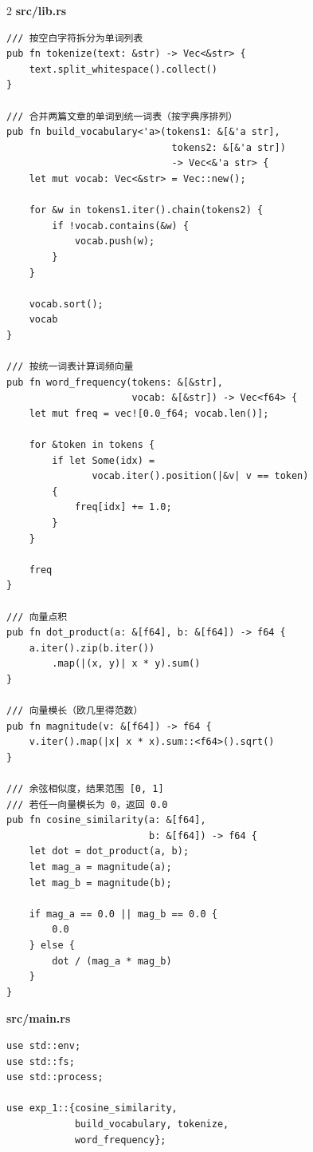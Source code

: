 {
\fontsize{7.5pt}{10pt}\selectfont
\setlength{\parindent}{0pt}
\setlength{\columnsep}{0.8cm}
\begin{multicols}{2}
\noindent\textbf{src/lib.rs}\par

\begin{verbatim}
/// 按空白字符拆分为单词列表
pub fn tokenize(text: &str) -> Vec<&str> {
    text.split_whitespace().collect()
}

/// 合并两篇文章的单词到统一词表（按字典序排列）
pub fn build_vocabulary<'a>(tokens1: &[&'a str],
                             tokens2: &[&'a str]) 
                             -> Vec<&'a str> {
    let mut vocab: Vec<&str> = Vec::new();

    for &w in tokens1.iter().chain(tokens2) {
        if !vocab.contains(&w) {
            vocab.push(w);
        }
    }

    vocab.sort();
    vocab
}

/// 按统一词表计算词频向量
pub fn word_frequency(tokens: &[&str],
                      vocab: &[&str]) -> Vec<f64> {
    let mut freq = vec![0.0_f64; vocab.len()];

    for &token in tokens {
        if let Some(idx) = 
               vocab.iter().position(|&v| v == token) 
        {
            freq[idx] += 1.0;
        }
    }

    freq
}

/// 向量点积
pub fn dot_product(a: &[f64], b: &[f64]) -> f64 {
    a.iter().zip(b.iter())
        .map(|(x, y)| x * y).sum()
}

/// 向量模长（欧几里得范数）
pub fn magnitude(v: &[f64]) -> f64 {
    v.iter().map(|x| x * x).sum::<f64>().sqrt()
}

/// 余弦相似度，结果范围 [0, 1]
/// 若任一向量模长为 0，返回 0.0
pub fn cosine_similarity(a: &[f64],
                         b: &[f64]) -> f64 {
    let dot = dot_product(a, b);
    let mag_a = magnitude(a);
    let mag_b = magnitude(b);

    if mag_a == 0.0 || mag_b == 0.0 {
        0.0
    } else {
        dot / (mag_a * mag_b)
    }
}
\end{verbatim}

\columnbreak

\noindent\textbf{src/main.rs}\par

\begin{verbatim}
use std::env;
use std::fs;
use std::process;

use exp_1::{cosine_similarity,
            build_vocabulary, tokenize,
            word_frequency};


\end{verbatim}
\end{multicols}}
